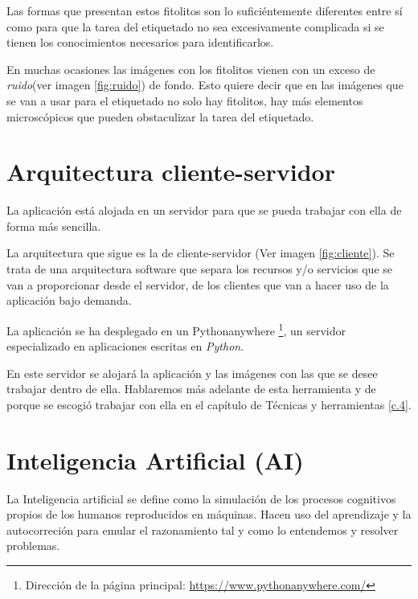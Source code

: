 
Las formas que presentan estos fitolitos son lo suficiéntemente diferentes entre sí como para que la tarea del etiquetado no sea excesivamente complicada si se tienen los conocimientos necesarios para identificarlos.

En muchas ocasiones las imágenes con los fitolitos vienen con un exceso de \textit{ruido}(ver imagen \ref{fig:ruido}) de fondo. Esto quiere decir que en las imágenes que se van a usar para el etiquetado no solo hay fitolitos, hay más elementos microscópicos que pueden obstaculizar la tarea del etiquetado.


\section{Arquitectura cliente-servidor}

La aplicación está alojada en un servidor para que se pueda trabajar con ella de forma más sencilla.

La arquitectura que sigue es la de cliente-servidor (Ver imagen \ref{fig:cliente}). Se trata de una arquitectura software que separa los recursos y/o servicios que se van a proporcionar desde el servidor, de los clientes que van a hacer uso de la aplicación bajo demanda.\cite{cliente}


La aplicación se ha desplegado en un Pythonanywhere \footnote{Dirección de la página principal: \url{https://www.pythonanywhere.com/}}, un servidor especializado en aplicaciones escritas en \textit{Python}. \cite{servidor}

En este servidor se alojará la aplicación y las imágenes con las que se desee trabajar dentro de ella. Hablaremos más adelante de esta herramienta y de porque se escogió trabajar con ella en el capítulo de Técnicas y herramientas \ref{c.4}.


\section{Inteligencia Artificial (AI)}

La Inteligencia artificial se define como la simulación de los procesos cognitivos propios de los humanos reproducidos en máquinas. Hacen uso del aprendizaje y la autocorreción para emular el razonamiento tal y como lo entendemos y resolver problemas.\cite{ai} 

